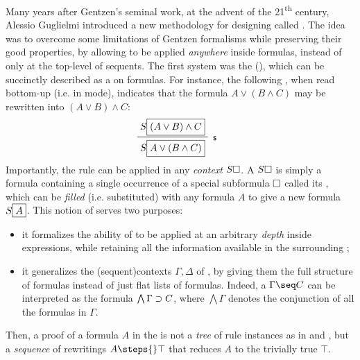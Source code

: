 \AP
Many years after Gentzen's seminal work, at the advent of the
21\textsuperscript{th} century, Alessio Guglielmi introduced a new methodology
for designing  called 
. The idea was to overcome some limitations of
Gentzen formalisms while preserving their good properties, by allowing
 to be applied \emph{anywhere} inside formulas, instead of
only at the top-level of sequents. The
first  system was the 
(), which can be succinctly described as a 
on formulas. For instance, the following , when read
bottom-up (i.e. in  mode), indicates that the formula $A \lor (B
\land C)$ may be rewritten into $(A \lor B) \land C$:
$$\R[\rsf{s}]{S\select{(A \lor B) \land C}}{S\select{A \lor (B \land C)}}$$
\AP Importantly, the rule can be applied in any \emph{context} $S\square$. A
 $S\square$ is simply a formula containing a single occurrence of a
special subformula $\square$ called its , which can be \emph{filled}
(i.e. substituted) with any formula $A$ to give a new formula $S\fbox{$A$}$.
This notion of  serves two purposes:
\begin{itemize}
  \item it formalizes the ability of  to be applied at an
  arbitrary \emph{depth} inside expressions, while retaining all the information
  available in the surrounding ;
  \item it generalizes the \kl(sequent){contexts} $\Gamma, \Delta$ of
  , by giving them the full structure of formulas instead
  of just flat lists of formulas. Indeed, a  $\Gamma \seq C$ can be
  interpreted as the formula $\bigwedge \Gamma \supset C$, where $\bigwedge
  \Gamma$ denotes the conjunction of all the formulas in $\Gamma$.
\end{itemize}
Then, a proof of a formula $A$ in the  is not a
\emph{tree} of rule instances as in  and , but a \emph{sequence} of rewritings $A \steps{} \top$ that reduces
$A$ to the trivially true  $\top$.

